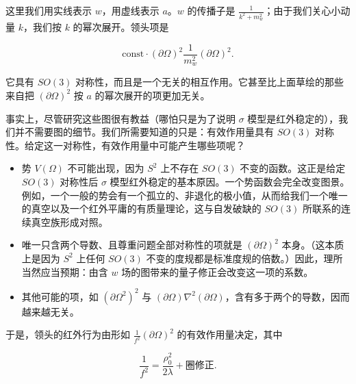 这里我们用实线表示 $w$，用虚线表示 $a$。$w$ 的传播子是 $\frac1{k^2+m_w^2}$；由于我们关心小动量 $k$，我们按 $k$ 的幂次展开。领头项是

\[
  \mathrm{const}\cdot(\partial\Omega)^2\frac1{m_w^2}(\partial\Omega)^2.
\]

它具有 $SO(3)$ 对称性，而且是一个无关的相互作用。它甚至比上面草绘的那些来自把 $(\partial\Omega)^2$ 按 $a$ 的幂次展开的项更加无关。

事实上，尽管研究这些图很有教益（哪怕只是为了说明 $\sigma$ 模型是红外稳定的），我们并不需要图的细节。我们所需要知道的只是：有效作用量具有 $SO(3)$ 对称性。给定这一对称性，有效作用量中可能产生哪些项呢？

\begin{itemize}
\item 势 $V(\Omega)$ 不可能出现，因为 $S^2$ 上不存在 $SO(3)$ 不变的函数。这正是给定 $SO(3)$ 对称性后 $\sigma$ 模型红外稳定的基本原因。一个势函数会完全改变图景。例如，一个一般的势会有一个孤立的、非退化的极小值，从而给我们一个唯一的真空以及一个红外平庸的有质量理论，这与自发破缺的 $SO(3)$ 所联系的连续真空族形成对照。
\item 唯一只含两个导数、且尊重问题全部对称性的项就是 $(\partial\Omega)^2$ 本身。（这本质上是因为 $S^2$ 上任何 $SO(3)$ 不变的度规都是标准度规的倍数。）因此，理所当然应当预期：由含 $w$ 场的图带来的量子修正会改变这一项的系数。
\item 其他可能的项，如 $(\partial\Omega^2)^2$ 与 $(\partial\Omega)\nabla^2(\partial\Omega)$，含有多于两个的导数，因而越来越无关。
\end{itemize}

于是，领头的红外行为由形如 $\frac1{f^2}(\partial\Omega)^2$ 的有效作用量决定，其中

\[
  \frac1{f^2}=\frac{\rho_0^2}{2\lambda}+\text{圈修正}.
\]


